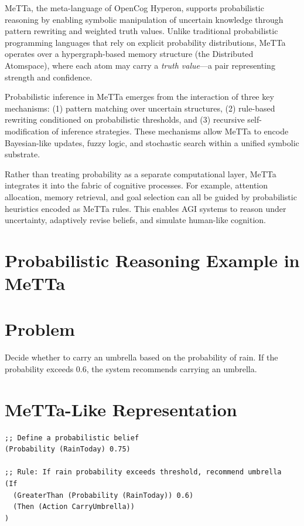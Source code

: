 \documentclass{article}
\begin{document}
MeTTa, the meta-language of OpenCog Hyperon, supports probabilistic reasoning by enabling symbolic manipulation of uncertain knowledge through pattern rewriting and weighted truth values. Unlike traditional probabilistic programming languages that rely on explicit probability distributions, MeTTa operates over a hypergraph-based memory structure (the Distributed Atomspace), where each atom may carry a \textit{truth value}---a pair representing strength and confidence.

Probabilistic inference in MeTTa emerges from the interaction of three key mechanisms: (1) pattern matching over uncertain structures, (2) rule-based rewriting conditioned on probabilistic thresholds, and (3) recursive self-modification of inference strategies. These mechanisms allow MeTTa to encode Bayesian-like updates, fuzzy logic, and stochastic search within a unified symbolic substrate.

Rather than treating probability as a separate computational layer, MeTTa integrates it into the fabric of cognitive processes. For example, attention allocation, memory retrieval, and goal selection can all be guided by probabilistic heuristics encoded as MeTTa rules. This enables AGI systems to reason under uncertainty, adaptively revise beliefs, and simulate human-like cognition.

\section{Probabilistic Reasoning Example in MeTTa}
\section{Problem}
Decide whether to carry an umbrella based on the probability of rain. If the probability exceeds 0.6, the system recommends carrying an umbrella.

\section{MeTTa-Like Representation}

\begin{verbatim}
;; Define a probabilistic belief
(Probability (RainToday) 0.75)

;; Rule: If rain probability exceeds threshold, recommend umbrella
(If
  (GreaterThan (Probability (RainToday)) 0.6)
  (Then (Action CarryUmbrella))
)
\end{verbatim}
\end{document}
